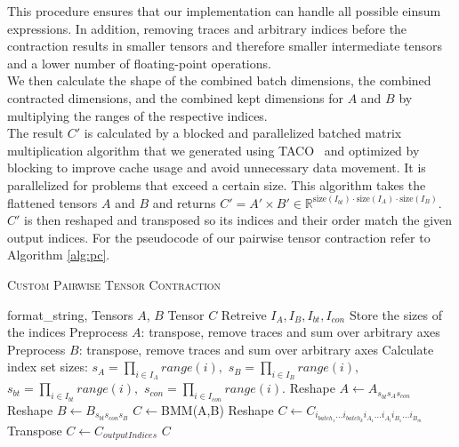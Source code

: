This procedure ensures that our implementation can handle all possible einsum expressions. In addition, removing traces and arbitrary indices before the contraction results in smaller tensors and therefore smaller intermediate tensors and a lower number of floating-point operations.\\
 We then calculate the shape of the combined batch dimensions, the combined contracted dimensions, and the combined kept dimensions for $A$ and $B$ by multiplying the ranges of the respective indices.\\
 The result $C'$ is calculated by a blocked and parallelized batched matrix multiplication algorithm that we generated using TACO~\cite{kjolstad2017taco} and optimized by blocking to improve cache usage and avoid unnecessary data movement. It is parallelized for problems that exceed a certain size. This algorithm takes the flattened tensors $A$ and $B$ and returns  $C' = A' \times B' \in \mathbb{R}^{\text{size}(I_{bt}) \cdot \text{size}(I_A) \cdot \text{size}(I_B)}$. $C'$ is then reshaped and transposed so its indices and their order match the given output indices. For the pseudocode of our pairwise tensor contraction refer to Algorithm \ref{alg:pc}.  \\
 \begin{algorithm}[H]
    \caption{\textsc{Custom Pairwise Tensor Contraction}}
        \label{alg:pc}
    \begin{algorithmic}[1]
        \REQUIRE format\_string, Tensors $A$, $B$
            \ENSURE Tensor $C$
            \STATE Retreive $I_A , I_B , I_{bt} , I_{con}$
            \STATE Store the sizes of the indices
            \STATE Preprocess $A$: transpose, remove traces and sum over arbitrary axes
            \STATE Preprocess $B$: transpose, remove traces and sum over arbitrary axes
            \STATE Calculate index set sizes: $s_A = \textstyle{\prod\limits_{i\in I_A} range(i)},$ 
            \STATE $s_B = \textstyle{\prod\limits_{i\in I_B} range(i)},$ 
            \STATE $s_{bt} = \textstyle{\prod\limits_{i\in I_{bt}} range(i)},$ 
            \STATE $s_{con} = \textstyle{\prod\limits_{i\in I_{con}} range(i)}.$
            \STATE Reshape $A \leftarrow A_{s_{bt} s_A s_{con}}$
            \STATE Reshape $B \leftarrow B_{s_{bt} s_{con} s_B}$
            \STATE $C\leftarrow$\textsc{BMM}(A,B)
            \STATE Reshape $C\leftarrow C_{i_{{batch}_1}...i_{{batch}_k} i_{{A}_1} ...i_{{A}_l} i_{B_1} ...i_{B_m}}$
            \STATE Transpose $C\leftarrow C_{outputIndices}$
            \RETURN $C$
    \end{algorithmic}
\end{algorithm}
    
